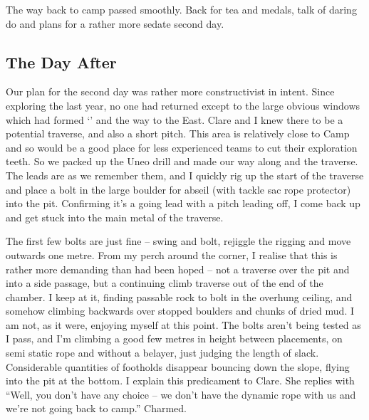 The way back to camp passed smoothly. Back for tea and medals, talk of
daring do and plans for a rather more sedate second day.


\subsection{The Day After}


Our plan for the second day was rather more constructivist in intent.
Since exploring the  last year, no one had returned
except to the large obvious windows which had formed `' and the way to the East. Clare and I knew there to be a
potential traverse, and also a short pitch. This area is relatively
close to Camp  and so would be a good place for less
experienced teams to cut their exploration teeth. So we packed up the Uneo drill and
made our way along  and the  traverse. The leads are as
we remember them, and I quickly rig up the start of the traverse and
place a bolt in the large boulder for abseil (with tackle sac rope
protector) into the pit. Confirming it's a going lead with a pitch
leading off, I come back up and get stuck into the main metal of the
traverse.


The first few bolts are just fine -- swing and bolt, rejiggle the
rigging and move outwards one metre. From my perch around the corner, I
realise that this is rather more demanding than had been hoped -- not a
traverse over the pit and into a side passage, but a continuing climb
traverse out of the end of the chamber. I keep at it, finding passable
rock to bolt in the overhung ceiling, and somehow climbing backwards
over stopped boulders and chunks of dried mud. I am not, as it were,
enjoying myself at this point. The bolts aren't being tested as I pass,
and I'm climbing a good few metres in height between placements, on semi
static rope and without a belayer, just judging the length of slack.
Considerable quantities of footholds disappear bouncing down the slope,
flying into the pit at the bottom. I explain this predicament to Clare.
She replies with ``Well, you don't have any choice -- we don't have the
dynamic rope with us and we're not going back to camp.'' Charmed.

